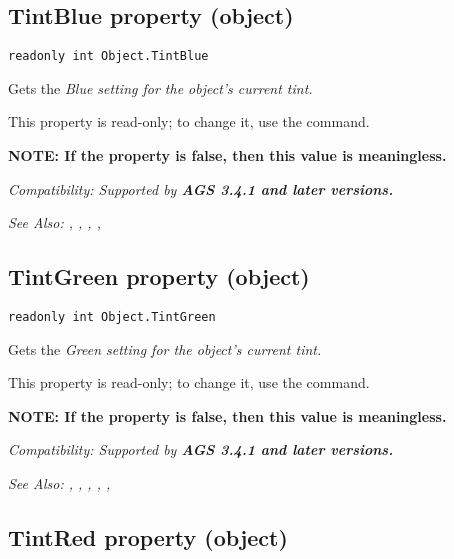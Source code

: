 \subsection{TintBlue property (object)}\label{Object.TintBlue}%

\begin{verbatim}
readonly int Object.TintBlue
\end{verbatim}
Gets the \it{Blue} setting for the object's current tint.

This property is read-only; to change it, use the  command.

\bf{NOTE:} If the  property is false, then
this value is meaningless.

\it{Compatibility:} Supported by \bf{AGS 3.4.1} and later versions.

\it{See Also:} , ,
, ,


\subsection{TintGreen property (object)}\label{Object.TintGreen}%

\begin{verbatim}
readonly int Object.TintGreen
\end{verbatim}
Gets the \it{Green} setting for the object's current tint.

This property is read-only; to change it, use the  command.

\bf{NOTE:} If the  property is false, then
this value is meaningless.

\it{Compatibility:} Supported by \bf{AGS 3.4.1} and later versions.

\it{See Also:} , ,
, ,
, 


\subsection{TintRed property (object)}\label{Object.TintRed}%

